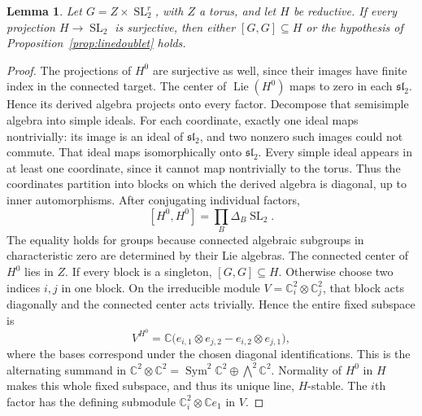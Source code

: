 \documentclass[11pt]{article}
\numberwithin{equation}{section}
\newtheorem{lemma}[theorem]{Lemma}
\theoremstyle{definition}
\theoremstyle{remark}
\newcommand{\C}{\mathbb C}
\newcommand{\SL}{\operatorname{SL}}
\newcommand{\Sym}{\operatorname{Sym}}
\newcommand{\Lie}{\operatorname{Lie}}
\begin{document}
\begin{lemma}\label{lem:subdirect}
Let $G=Z\times\SL_2^r$, with $Z$ a torus, and let $H$ be reductive.
If every projection $H\to\SL_2$ is surjective, then either
$[G,G]\subseteq H$ or the hypothesis of
Proposition~\ref{prop:linedoublet} holds.
\end{lemma}
\begin{proof}
The projections of $H^0$ are surjective as well, since their images have
finite index in the connected target. The center of $\Lie(H^0)$ maps
to zero in each $\mathfrak{sl}_2$. Hence its derived algebra projects
onto every factor. Decompose that semisimple algebra into simple ideals.
For each coordinate, exactly one ideal maps nontrivially: its image is
an ideal of $\mathfrak{sl}_2$, and two nonzero such images could not
commute. That ideal maps isomorphically onto $\mathfrak{sl}_2$.
Every simple ideal appears in at least one coordinate, since it cannot
map nontrivially to the torus. Thus the coordinates partition into
blocks on which the derived algebra is diagonal, up to inner
automorphisms. After conjugating individual factors,
\[
 [H^0,H^0]=\prod_B\Delta_B\SL_2.
\]
The equality holds for groups because connected algebraic subgroups
in characteristic zero are determined by their Lie algebras. The
connected center of $H^0$ lies in $Z$.
If every block is a singleton, $[G,G]\subseteq H$. Otherwise choose
two indices $i,j$ in one block. On the irreducible module
$V=\C_i^2\otimes\C_j^2$, that block acts diagonally and the connected
center acts trivially. Hence the entire fixed subspace is
\[
 V^{H^0}=\C\bigl(e_{i,1}\otimes e_{j,2}-e_{i,2}\otimes e_{j,1}\bigr),
\]
where the bases correspond under the chosen diagonal identifications.
This is the alternating summand in
$\C^2\otimes\C^2=\Sym^2\C^2\oplus\bigwedge^2\C^2$.
Normality of $H^0$ in $H$ makes this whole fixed subspace, and thus
its unique line, $H$-stable. The $i$th factor has the defining
submodule $\C_i^2\otimes\C e_1$ in $V$.
\end{proof}
\end{document}
